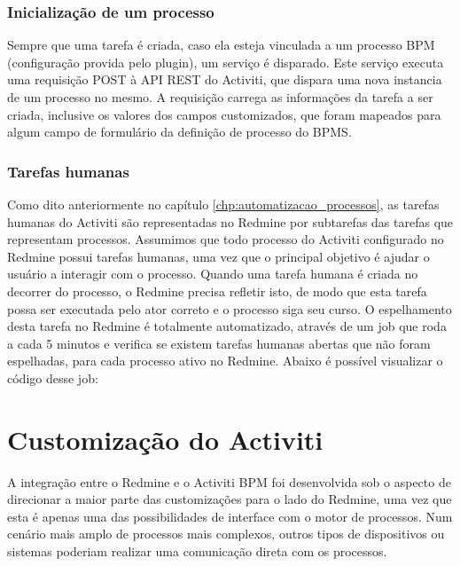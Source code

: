 
\subsubsection{Inicialização de um processo}\label{sec:integracao_redmine_activiti_sincronizacao_inicializacao_processo}
Sempre que uma tarefa é criada, caso ela esteja vinculada a um processo BPM (configuração provida pelo plugin), um serviço é disparado. Este serviço executa uma requisição POST à API REST do Activiti, que dispara uma nova instancia de um processo no mesmo. A requisição carrega as informações da tarefa a ser criada, inclusive os valores dos campos customizados, que foram mapeados para algum campo de formulário da definição de processo do BPMS.

\subsubsection{Tarefas humanas}\label{sec:integracao_redmine_activiti_implementacao_detalhes_desenvolvimento_sincronizacao_human_task}

Como dito anteriormente no capítulo  \ref{chp:automatizacao_processos}, as tarefas humanas do Activiti são representadas no Redmine por subtarefas das tarefas que representam processos. Assumimos que todo processo do Activiti configurado no Redmine possui tarefas humanas, uma vez que o principal objetivo é ajudar o usuário a interagir com o processo.
Quando uma tarefa humana é criada no decorrer do processo, o Redmine precisa refletir isto, de modo que esta tarefa possa ser executada pelo ator correto e o processo siga seu curso. O espelhamento desta tarefa no Redmine é totalmente automatizado, através de um job que roda a cada 5 minutos e verifica se existem tarefas humanas abertas que não foram espelhadas, para cada processo ativo no Redmine.
Abaixo é possível visualizar o código desse job:


\section{Customização do Activiti}\label{sec:integracao_redmine_activiti-implementacao-activiti}

A integração entre o Redmine e o Activiti BPM foi desenvolvida sob o aspecto de direcionar a maior parte das customizações para o lado do Redmine, uma vez que esta é apenas uma das possibilidades de interface com o motor de processos. Num cenário mais amplo de processos mais complexos, outros tipos de dispositivos ou sistemas poderiam realizar uma comunicação direta com os processos.

